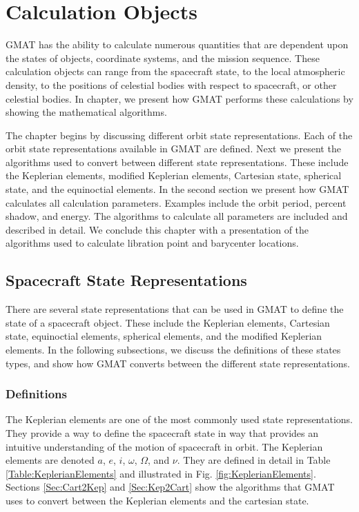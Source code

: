 \chapter{Calculation Objects} \label{Ch:CalculationObjects}

GMAT has the ability to calculate numerous quantities that are
dependent upon the states of objects, coordinate systems, and the
mission sequence.   These calculation objects can range from the
spacecraft state, to the local atmospheric density, to the
positions of celestial bodies with respect to spacecraft, or other
celestial bodies.  In chapter, we present how GMAT performs these
calculations by showing the mathematical algorithms.

The chapter begins by discussing different orbit state
representations.  Each of the orbit state representations
available in GMAT are defined.  Next we present the algorithms
used to convert between different state representations.  These
include the Keplerian elements, modified Keplerian elements,
Cartesian state, spherical state, and the equinoctial elements. In
the second section we present how GMAT calculates all calculation
parameters. Examples include the orbit period, percent shadow, and
energy. The algorithms to calculate all parameters are included
and described in detail. We conclude this chapter with a
presentation of the algorithms used to calculate libration point
and barycenter locations.

\section{Spacecraft State Representations} 

There are several state representations that can be used in GMAT
to define the state of a spacecraft object.  These include the
Keplerian elements, Cartesian state, equinoctial elements,
spherical elements, and the modified Keplerian elements.  In the
following subsections, we discuss the definitions of these states
types, and show how GMAT converts between the different state
representations.

\subsection{Definitions}

The Keplerian elements are one of the most commonly used state
representations.  They provide a way to define the spacecraft
state in way that provides an intuitive understanding of the
motion of spacecraft in orbit.  The Keplerian elements are denoted
$a$, $e$, $i$, $\omega$, $\Omega$, and $\nu$. They are defined in
detail in Table \ref{Table:KeplerianElements} and illustrated in
Fig. \ref{fig:KeplerianElements}.  Sections \ref{Sec:Cart2Kep} and
\ref{Sec:Kep2Cart} show the algorithms that GMAT uses to convert
between the Keplerian elements and the cartesian state.
%

